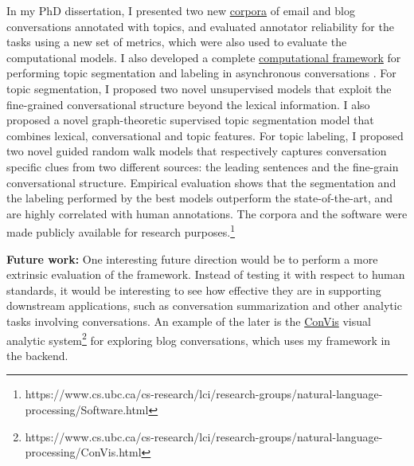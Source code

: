 \documentclass{article} %
\begin{document}
In my PhD dissertation, I presented two new \href{https://www.cs.ubc.ca/cs-research/lci/research-groups/natural-language-processing/bc3.html} {corpora} of email and blog conversations annotated with topics, and evaluated annotator reliability for the tasks using a new set of metrics, which were also used to evaluate the computational models. I also developed a complete \href{https://www.cs.ubc.ca/cs-research/lci/research-groups/natural-language-processing/Software.html} {computational framework} for performing topic segmentation and labeling in asynchronous conversations \cite{Shafiq13_Jair,Shafiq10}. For topic segmentation, I proposed two novel unsupervised models that exploit the fine-grained conversational structure beyond the lexical information. I also proposed a novel graph-theoretic supervised topic segmentation model that combines lexical, conversational and topic features. For topic labeling, I proposed two novel guided random walk models that respectively captures conversation specific clues from two different sources: the leading sentences and the fine-grain conversational structure. Empirical evaluation shows that the segmentation and the labeling performed by the best models outperform the state-of-the-art, and are highly correlated with human annotations. The corpora and the software were made publicly available for research purposes.\footnote{https://www.cs.ubc.ca/cs-research/lci/research-groups/natural-language-processing/Software.html} 


\textbf{Future work:} One interesting future direction would be to perform a more extrinsic evaluation of the framework. Instead of testing it with respect to human standards, it would be interesting to see how effective they are in supporting downstream applications, such as conversation summarization and other analytic tasks involving conversations. An example of the later is the \href{https://www.cs.ubc.ca/cs-research/lci/research-groups/natural-language-processing/ConVis.html}{ConVis} visual analytic system\footnote{https://www.cs.ubc.ca/cs-research/lci/research-groups/natural-language-processing/ConVis.html} for exploring blog conversations, which uses my framework in the backend.  


\end{document}
